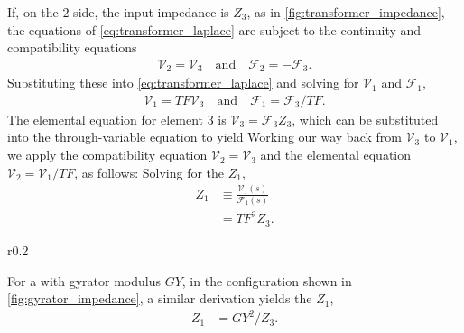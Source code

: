 \documentclass[dynamic_systems.tex]{subfiles}
\begin{document}
If, on the $2$-side, the input impedance is $Z_3$, as in \cref{fig:transformer_impedance}, the equations of \cref{eq:transformer_laplace} are subject to the continuity and compatibility equations
\tags{}
\begin{align}
	\mathcal{V}_2 = \mathcal{V}_3
	\quad
	\text{and}
	\quad
	\mathcal{F}_2 = -\mathcal{F}_3.
\end{align}
Substituting these into \cref{eq:transformer_laplace} and solving for $\mathcal{V}_1$ and $\mathcal{F}_1$,
\begin{align}
	\mathcal{V}_1 = TF \mathcal{V}_3
	\quad
	\text{and}
	\quad
	\mathcal{F}_1 = \mathcal{F}_3/TF.
\end{align}
The elemental equation for element $3$ is $\mathcal{V}_3 = \mathcal{F}_3 Z_3$, which can be substituted into the through-variable equation to yield
Working our way back from $\mathcal{V}_3$ to $\mathcal{V}_1$, we apply the compatibility equation $\mathcal{V}_2 = \mathcal{V}_3$ and the elemental equation $\mathcal{V}_2 = \mathcal{V}_1/TF$, as follows:
Solving for the  $Z_1$,
\begin{align}
	Z_1 &\equiv \frac{\mathcal{V}_1(s)}{\mathcal{F}_1(s)} \\
	&= TF^2 Z_3.
\end{align}

\begin{wrapfigure}[6]{r}{0.2\textwidth}
\centering
{}
\caption{}
\label{fig:gyrator_impedance}
\end{wrapfigure}
For a  with gyrator modulus $GY$, in the configuration shown in \cref{fig:gyrator_impedance}, a similar derivation yields the  $Z_1$,
\begin{align}
	Z_1 &= GY^2/Z_3.
\end{align}
\end{document}
